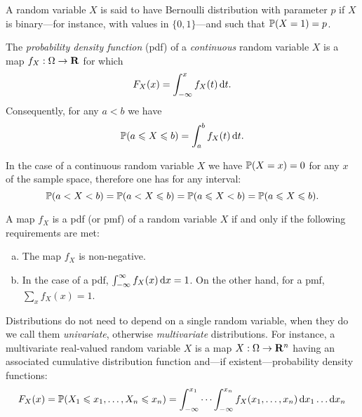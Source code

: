 \begin{definition}
    \label{def:bernoulli-random-variable}
    A random variable \(X\) is said to have Bernoulli distribution with parameter
    \(p\) if \(X\) is binary---for instance, with values in \(\{0, 1\}\)---and such
    that \(\operatorname{\mathbb{P}}(X = 1) = p\).
\end{definition}

\begin{definition}
    \label{def:probability-mass-function}
    The \emph{probability density function} (pdf) of a \emph{continuous} random variable
    \(X\) is a map \(f_X: \Omega \to \mathbf{R}\) for which
    \[
        F_X(x) = \int_{-\infty}^x f_X(t)\, \mathrm{d} t.
    \]
    Consequently, for any \(a < b\) we have
    \[
        \operatorname{\mathbb{P}}(a \leqslant X \leqslant b) = \int_a^b f_X(t)\, \mathrm{d} t.
    \]
\end{definition}

\begin{remark}
    \label{rem:interval-probability-continuous-random-variable}
    In the case of a continuous random variable \(X\) we have \(\operatorname{\mathbb{P}}(X = x) = 0\)
    for any \(x\) of the sample space, therefore one has for any interval:
    \[
        \operatorname{\mathbb{P}}(a < X < b)
        = \operatorname{\mathbb{P}}(a < X \leqslant b)
        = \operatorname{\mathbb{P}}(a \leqslant X < b)
        = \operatorname{\mathbb{P}}(a \leqslant X \leqslant b).
    \]
\end{remark}

\begin{theorem}
    \label{thm:prob-density-fn-equivalent-conditions}
    A map \(f_X\) is a pdf (or pmf) of a random variable \(X\) if and only if the
    following requirements are met:
    \begin{enumerate}[(a)]\setlength\itemsep{0em}
        \item The map \(f_X\) is non-negative.
        \item In the case of a pdf, \(\int_{-\infty}^{\infty} f_X(x)\, \mathrm{d} x = 1\). On
              the other hand, for a pmf, \(\sum_x f_X(x) = 1\).
    \end{enumerate}
\end{theorem}

\begin{notation}
    \label{not:univariate-multivariate-distributions}
    Distributions do not need to depend on a single random variable, when they do we
    call them \emph{univariate}, otherwise \emph{multivariate} distributions. For
    instance, a multivariate real-valued random variable \(X\) is a map
    \(X: \Omega \to \mathbf{R}^n\) having an associated cumulative distribution function
    and---if existent---probability density functions:
    \[
        F_X(x) = \operatorname{\mathbb{P}}(X_1 \leqslant x_1, \dots, X_n \leqslant x_n)
        = \int_{-\infty}^{x_1} \cdots \int_{-\infty}^{x_n} f_X(x_1, \dots, x_n)\,
        \mathrm{d} x_1 \dots \mathrm{d} x_n
    \]
\end{notation}

